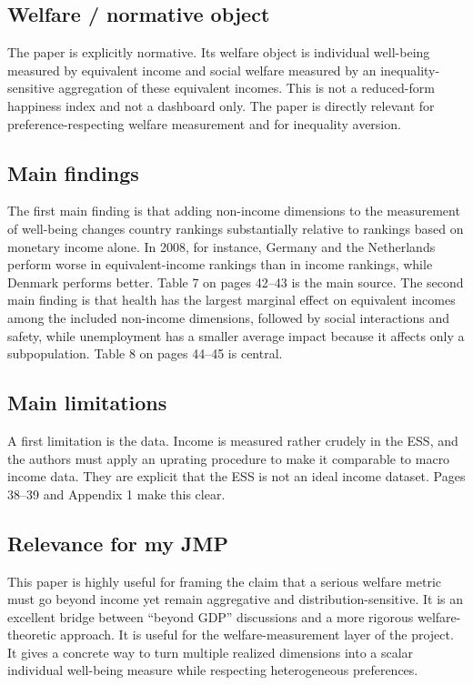 \documentclass[11pt,a4paper]{article}
\begin{document}
\subsection*{Welfare / normative object}
The paper is explicitly normative. Its welfare object is individual well-being measured by equivalent income and social welfare measured by an inequality-sensitive aggregation of these equivalent incomes. This is not a reduced-form happiness index and not a dashboard only. The paper is directly relevant for preference-respecting welfare measurement and for inequality aversion.

\subsection*{Main findings}
The first main finding is that adding non-income dimensions to the measurement of well-being changes country rankings substantially relative to rankings based on monetary income alone. In 2008, for instance, Germany and the Netherlands perform worse in equivalent-income rankings than in income rankings, while Denmark performs better. Table 7 on pages 42–43 is the main source. The second main finding is that health has the largest marginal effect on equivalent incomes among the included non-income dimensions, followed by social interactions and safety, while unemployment has a smaller average impact because it affects only a subpopulation. Table 8 on pages 44–45 is central.

\subsection*{Main limitations}
A first limitation is the data. Income is measured rather crudely in the ESS, and the authors must apply an uprating procedure to make it comparable to macro income data. They are explicit that the ESS is not an ideal income dataset. Pages 38–39 and Appendix 1 make this clear.

\subsection*{Relevance for my JMP}
This paper is highly useful for framing the claim that a serious welfare metric must go beyond income yet remain aggregative and distribution-sensitive. It is an excellent bridge between “beyond GDP” discussions and a more rigorous welfare-theoretic approach. It is useful for the welfare-measurement layer of the project. It gives a concrete way to turn multiple realized dimensions into a scalar individual well-being measure while respecting heterogeneous preferences.
\end{document}
